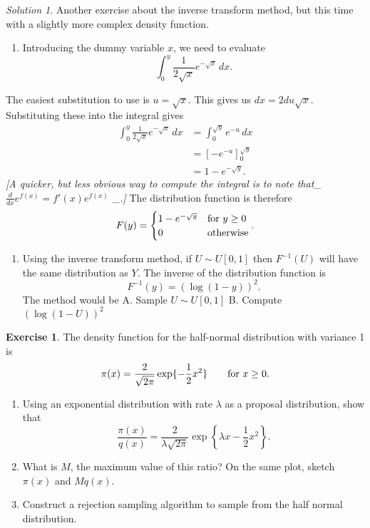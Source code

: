 \documentclass[
]{book}
\providecommand{\tightlist}{%
  \setlength{\itemsep}{0pt}\setlength{\parskip}{0pt}}
\theoremstyle{definition}
\theoremstyle{definition}
\theoremstyle{definition}
\newtheorem{exercise}{Exercise}[chapter]
\theoremstyle{definition}
\theoremstyle{remark}
\newtheorem*{solution}{Solution}
\begin{document}
\begin{solution}

Another exercise about the inverse transform method, but this time with a slightly more complex density function.

\begin{enumerate}
\def\labelenumi{\arabic{enumi}.}
\tightlist
\item
  Introducing the dummy variable \(x\), we need to evaluate
  \[
  \int_0^y \frac{1}{2\sqrt{x}}e^{-\sqrt{x}}\,dx.
  \]
\end{enumerate}

The easiest substitution to use is \(u = \sqrt{x}\). This gives us \(dx = 2du\sqrt{x}\). Substituting these into the integral gives
\begin{align*}
\int_0^y \frac{1}{2\sqrt{x}}e^{-\sqrt{x}}\,dx & = \int_0^\sqrt{y} e^{-u}\,dx \\
&= \left[-e^{-u}\right]_0^\sqrt{y} \\
&= 1 - e^{-\sqrt{y}}.
\end{align*}
\emph{{[}A quicker, but less obvious way to compute the integral is to note that\_ \(\frac{d}{dx}e^{f(x)} = f'(x)e^{f(x)}\) \_.{]}}
The distribution function is therefore
\[
F(y) = \begin{cases}
1 - e^{-\sqrt{y}} & \hbox{for } y \geq 0 \\
0  & \hbox{otherwise}
\end{cases}.
\]

\begin{enumerate}
\def\labelenumi{\arabic{enumi}.}
\setcounter{enumi}{1}
\tightlist
\item
  Using the inverse transform method, if \(U\sim U[0, 1]\) then \(F^{-1}(U)\) will have the same distribution as \(Y\). The inverse of the distribution function is
  \[
  F^{-1}(y) = (\log(1-y))^2.
  \]
  The method would be
  A. Sample \(U\sim U[0, 1]\)
  B. Compute \((\log(1-U))^2\)
\end{enumerate}

\end{solution}

\begin{exercise}

The density function for the half-normal distribution with variance 1 is
\[
\pi(x) = \frac{2}{\sqrt{2\pi}}\exp\{-\frac{1}{2}x^2\} \qquad \hbox{for } x \geq 0. 
\]

\begin{enumerate}
\def\labelenumi{\arabic{enumi}.}
\tightlist
\item
  Using an exponential distribution with rate \(\lambda\) as a proposal distribution, show that
  \[
   \frac{\pi(x)}{q(x)} = \frac{2}{\lambda\sqrt{2\pi}}\exp\left\{\lambda x - \frac{1}{2}x^2 \right\}.
   \]
\item
  What is \(M\), the maximum value of this ratio? On the same plot, sketch \(\pi(x)\) and \(Mq(x)\).
\item
  Construct a rejection sampling algorithm to sample from the half normal distribution.
\end{enumerate}

\end{exercise}
\end{document}
